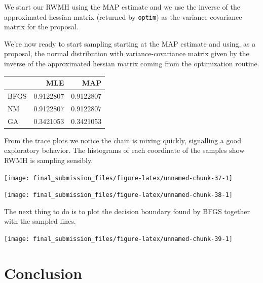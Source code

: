 \documentclass[]{article}
\begin{document}
We start our RWMH using the MAP estimate and we use the inverse of the
approximated hessian matrix (returned by \texttt{optim}) as the
variance-covariance matrix for the proposal.

We're now ready to start sampling starting at the MAP estimate and
using, as a proposal, the normal distribution with variance-covariance
matrix given by the inverse of the approximated hessian matrix coming
from the optimization routine.

\begin{longtable}[]{@{}lrr@{}}
\toprule
& MLE & MAP\tabularnewline
\midrule
\endhead
BFGS & 0.9122807 & 0.9122807\tabularnewline
NM & 0.9122807 & 0.9122807\tabularnewline
GA & 0.3421053 & 0.3421053\tabularnewline
\bottomrule
\end{longtable}

From the trace plots we notice the chain is mixing quickly, signalling a
good exploratory behavior. The histograms of each coordinate of the
samples show RWMH is sampling sensibly.

\begin{center}\texttt{[image: final\_submission\_files/figure-latex/unnamed-chunk-37-1]} \end{center}

\begin{center}\texttt{[image: final\_submission\_files/figure-latex/unnamed-chunk-38-1]} \end{center}

The next thing to do is to plot the decision boundary found by BFGS
together with the sampled lines.

\begin{center}\texttt{[image: final\_submission\_files/figure-latex/unnamed-chunk-39-1]} \end{center}

\newpage

\section{Conclusion}\label{conclusion}
\end{document}
